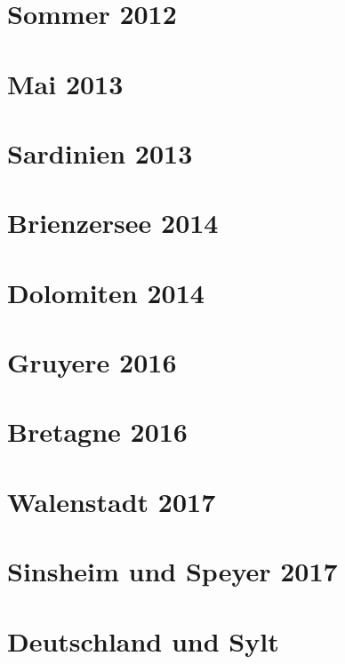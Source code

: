 \documentclass[11pt,nswissgerman]{article}
\begin{document}
\section{Sommer 2012}

\newpage
\section{Mai 2013}

\newpage
\section{Sardinien 2013}

\newpage
\section{Brienzersee 2014}

\newpage
\section{Dolomiten 2014}

\newpage
\section{Gruyere 2016}

\newpage
\section{Bretagne 2016}

\newpage
\section{Walenstadt 2017}

\newpage
\section{Sinsheim und Speyer 2017}

\newpage
\section{Deutschland und Sylt}

\newpage
\listoffigures
\newpage
\appendix
\end{document}
